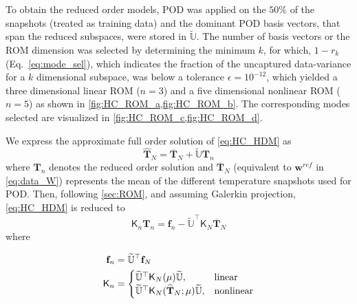 \documentclass[11pt]{article}
\renewcommand{\vec}[1]{\mathbf{#1}}
\newcommand{\mat}[1]{\mathsf{#1}}
\begin{document}
        To obtain the reduced order models, POD was applied on the $50\%$ of the snapshots (treated as training data) and the dominant POD basis vectors, that span the reduced subspaces, were stored in $\mathbb{\widetilde{U}}$.
        The number of basis vectors or the ROM dimension was selected by determining the minimum $k$, for which,  $1-r_k$ (Eq.~\ref{eq:mode_sel}), which indicates the fraction of the uncaptured data-variance for a $k$ dimensional subspace, was below a tolerance $\epsilon = 10^{-12}$, which yielded a three dimensional linear ROM ($n=3$) and a five dimensional nonlinear ROM ($n=5$) as shown in \cref{fig:HC_ROM_a,fig:HC_ROM_b}.
        The corresponding modes selected are visualized in \cref{fig:HC_ROM_c,fig:HC_ROM_d}.


        We express the approximate full order solution of \cref{eq:HC_HDM} as
        \begin{equation}
        \widehat{\vec{T}}_N = \overline{\vec{T}}_N + \mathbb{\widetilde{U}} \vec{T}_n
        \label{eq:T_rec}
        \end{equation}
        where $\vec{T}_n$ denotes the reduced order solution and $\overline{\vec{T}}_N$ (equivalent to $\vec{w}^{ref}$ in \cref{eq:data_W}) represents the mean of the different temperature snapshots used for POD.
        Then, following \cref{sec:ROM}, and assuming Galerkin projection, \cref{eq:HC_HDM} is reduced to
        \begin{equation}
        \mat{K}_n\vec{T}_n = \vec{f}_n- \widetilde{\mathbb{U}}^\top \mat{K}_N\overline{\vec{T}}_N
        \label{eq:HC_ROM}
        \end{equation}
        where

        \begin{subequations}
            \centering
            \begin{align}
            \vec{f}_n &= \mathbb{\widetilde{U}}^\top \vec{f}_N
            \label{eq:f_red} \\
            \mat{K}_n &=
            \begin{cases}
                \mathbb{\widetilde{U}}^\top \mat{K}_N(\mu) \mathbb{\widetilde{U}}, & \text{linear}   \\
                \mathbb{\widetilde{U}}^\top \mat{K}_N(\widehat{\vec{T}}_N ;\mu ) \mathbb{\widetilde{U}}, & \text{nonlinear}
            \end{cases}
            \label{eq:K_red}
            \end{align}
            \label{eq:red_qoi}
        \end{subequations}
\end{document}
